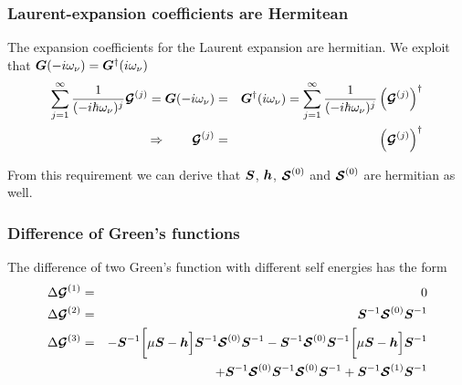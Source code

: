 \documentclass[11pt,a4paper]{report}
\begin{document}
\subsubsection{Laurent-expansion coefficients are Hermitean}
The expansion coefficients for the Laurent expansion are hermitian.
We exploit that $\bm{G}(-i\omega_\nu)=\bm{G}^\dagger(i\omega_\nu)$
\begin{eqnarray}
\sum_{j=1}^\infty\frac{1}{(-i\hbar\omega_\nu)^j}\bm{\mathcal{G}}^{(j)}
=\bm{G}(-i\omega_\nu)&=&\bm{G}^\dagger(i\omega_\nu)
=\sum_{j=1}^\infty\frac{1}{(-i\hbar\omega_\nu)^j}
\left(\bm{\mathcal{G}}^{(j)}\right)^\dagger
\nonumber\\
\Rightarrow\qquad
\bm{\mathcal{G}}^{(j)}&=&\left(\bm{\mathcal{G}}^{(j)}\right)^\dagger
\end{eqnarray}

From this requirement we can derive that $\bm{S}$, $\bm{h}$,
$\bm{\mathcal{S}}^{(0)}$ and $\bm{\mathcal{S}}^{(0)}$ are hermitian as well.

\subsubsection{Difference of Green's functions}
The difference of two Green's function with different self energies
has the form
\begin{eqnarray}
\Delta\bm{\mathcal{G}}^{(1)}&=&0
\\
\Delta\bm{\mathcal{G}}^{(2)}&=&
\bm{S}^{-1}\bm{\mathcal{S}}^{(0)}\bm{S}^{-1}
\\
\Delta\bm{\mathcal{G}}^{(3)}
&=&
-\bm{S}^{-1}\biggl[\mu\bm{S}-\bm{h}\Bigr]\bm{S}^{-1}
\bm{\mathcal{S}}^{(0)}\bm{S}^{-1}
-\bm{S}^{-1}\bm{\mathcal{S}}^{(0)}\bm{S}^{-1}
\biggl[\mu\bm{S}-\bm{h}\Bigr]\bm{S}^{-1}
\nonumber\\
&&+\bm{S}^{-1}\bm{\mathcal{S}}^{(0)}\bm{S}^{-1}\bm{\mathcal{S}}^{(0)}
\bm{S}^{-1}
+
\bm{S}^{-1}\bm{\mathcal{S}}^{(1)}\bm{S}^{-1}
\end{eqnarray}

\end{document}
